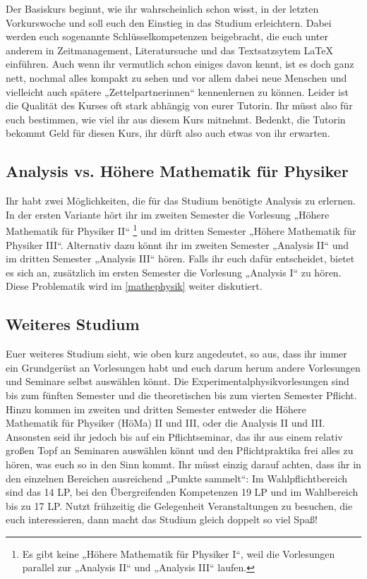 Der Basiskurs beginnt, wie ihr wahrscheinlich schon wisst, in der letzten Vorkurswoche und soll euch den Einstieg in das Studium erleichtern. Dabei werden euch sogenannte Schlüsselkompetenzen beigebracht, die euch unter anderem in Zeitmanagement, Literatursuche und das Textsatzsytem \LaTeX{} einführen. Auch wenn ihr vermutlich schon einiges davon kennt, ist es doch ganz nett, nochmal alles kompakt zu sehen und vor allem dabei neue Menschen und vielleicht auch spätere „Zettelpartnerinnen“ kennenlernen zu können. Leider ist die Qualität des Kurses oft stark abhängig von eurer Tutorin. Ihr müsst also für euch bestimmen, wie viel ihr aus diesem Kurs mitnehmt. Bedenkt, die Tutorin bekommt Geld für diesen Kurs, ihr dürft also auch etwas von ihr erwarten. %

\subsection{Analysis vs. Höhere Mathematik für Physiker}
Ihr habt zwei Möglichkeiten, die für das Studium benötigte Analysis zu erlernen.
In der ersten Variante hört ihr im zweiten Semester die Vorlesung „Höhere Mathematik für Physiker II“ \footnote{Es gibt keine „Höhere Mathematik für Physiker I“, weil die Vorlesungen parallel zur „Analysis II“ und „Analysis III“ laufen.} und im dritten Semester „Höhere Mathematik für Physiker III“. Alternativ dazu könnt ihr im zweiten Semester „Analysis II“ und im dritten Semester „Analysis III“ hören. Falls ihr euch dafür entscheidet, bietet es sich an, zusätzlich im ersten Semester die Vorlesung „Analysis I“ zu hören. Diese Problematik wird im \autoref{mathephysik} weiter diskutiert.

\subsection{Weiteres Studium}

Euer weiteres Studium sieht, wie oben kurz angedeutet, so aus, dass ihr immer ein Grundgerüst an Vorlesungen habt und euch darum herum andere Vorlesungen und Seminare selbst auswählen könnt. Die Experimentalphysikvorlesungen sind bis zum fünften Semester und die theoretischen bis zum vierten Semester Pflicht. Hinzu kommen im zweiten und dritten Semester entweder die Höhere Mathematik für Physiker (HöMa) II und III, oder die Analysis II und III. Ansonsten seid ihr jedoch bis auf ein Pflichtseminar, das ihr aus einem relativ großen Topf an Seminaren auswählen könnt und den Pflichtpraktika frei alles zu hören, was euch so in den Sinn kommt. Ihr müsst einzig darauf achten, dass ihr in den einzelnen Bereichen ausreichend „Punkte sammelt“: Im Wahlpflichtbereich sind das 14 \gls{LP}, bei den Übergreifenden Kompetenzen 19 \gls{LP} und im Wahlbereich bis zu 17 \gls{LP}. Nutzt frühzeitig die Gelegenheit Veranstaltungen zu besuchen, die euch interessieren, dann macht das Studium gleich doppelt so viel Spaß!

